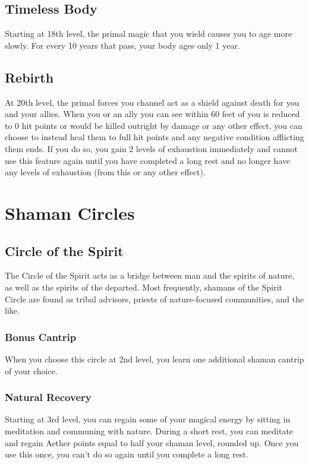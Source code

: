 \subsection{Timeless Body}

Starting at 18th level, the primal magic that you wield causes you to age more slowly. For every 10 years that pass, your body ages only 1 year.

\subsection{Rebirth}
At 20th level, the primal forces you channel act as a shield against death for you and your allies. When you or an ally you can see within 60 feet of you is reduced to 0 hit points or would be killed outright by damage or any other effect, you can choose to instead heal them to full hit points and any negative condition afflicting them ends. If you do so, you gain 2 levels of exhaustion immediately and cannot use this feature again until you have completed a long rest and no longer have any levels of exhaustion (from this or any other effect).

\section{Shaman Circles}

\subsection{Circle of the Spirit}

The Circle of the Spirit acts as a bridge between man and the spirits of nature, as well as the spirits of the departed. Most frequently, shamans of the Spirit Circle are found as tribal advisors, priests of nature-focused communities, and the like.

\subsubsection{Bonus Cantrip}

When you choose this circle at 2nd level, you learn one additional shaman cantrip of your choice.

\subsubsection{Natural Recovery}

Starting at 3rd level, you can regain some of your magical energy by sitting in meditation and communing with nature. During a short rest, you can meditate and regain Aether points equal to half your shaman level, rounded up. Once you use this once, you can't do so again until you complete a long rest.

